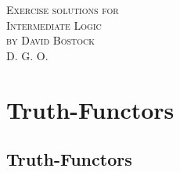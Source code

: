 \documentclass[a4paper,12pt]{article}
\begin{document}
    \begin{titlepage}
        \begin{center}
            \textsc{\large Exercise solutions for\\
            Intermediate Logic\\
            by David Bostock}\\[1.5cm]
            \textsc{D. G. O.}
        \end{center}
    \end{titlepage}

    \newpage

    \setcounter{section}{1}

    \section{Truth-Functors}

    \subsection{Truth-Functors}
\end{document}
